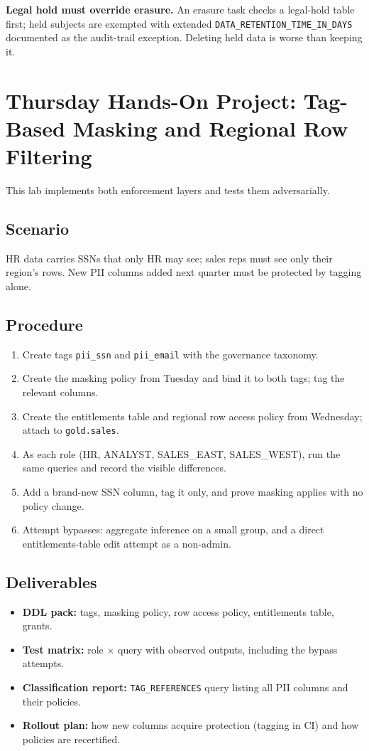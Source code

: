 \begin{pitfall}
\textbf{Legal hold must override erasure.} An erasure task checks a legal-hold table first; held subjects are exempted with extended \texttt{DATA\_RETENTION\_TIME\_IN\_DAYS} documented as the audit-trail exception. Deleting held data is worse than keeping it.
\end{pitfall}

\section{Thursday Hands-On Project: Tag-Based Masking and Regional Row Filtering}
This lab implements both enforcement layers and tests them adversarially.

\subsection*{Scenario}
HR data carries SSNs that only HR may see; sales reps must see only their region's rows. New PII columns added next quarter must be protected by tagging alone.

\subsection*{Procedure}
\begin{enumerate}
    \item Create tags \texttt{pii\_ssn} and \texttt{pii\_email} with the governance taxonomy.
    \item Create the masking policy from Tuesday and bind it to both tags; tag the relevant columns.
    \item Create the entitlements table and regional row access policy from Wednesday; attach to \texttt{gold.sales}.
    \item As each role (HR, ANALYST, SALES\_EAST, SALES\_WEST), run the same queries and record the visible differences.
    \item Add a brand-new SSN column, tag it only, and prove masking applies with no policy change.
    \item Attempt bypasses: aggregate inference on a small group, and a direct entitlements-table edit attempt as a non-admin.
\end{enumerate}

\subsection*{Deliverables}
\begin{itemize}
    \item \textbf{DDL pack:} tags, masking policy, row access policy, entitlements table, grants.
    \item \textbf{Test matrix:} role $\times$ query with observed outputs, including the bypass attempts.
    \item \textbf{Classification report:} \texttt{TAG\_REFERENCES} query listing all PII columns and their policies.
    \item \textbf{Rollout plan:} how new columns acquire protection (tagging in CI) and how policies are recertified.
\end{itemize}

